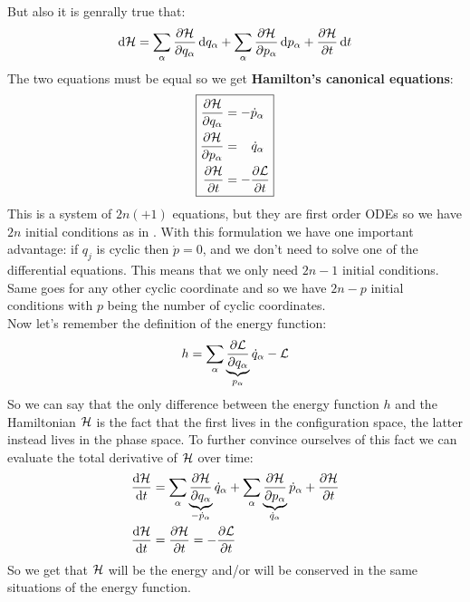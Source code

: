 But also it is genrally true that:
\begin{equation}
    \dd{\hamfun} = \bigsum_{\alpha} \pdv{\hamfun}{q_{\alpha}}\dd{q_{\alpha}} + \bigsum_{\alpha} \pdv{\hamfun}{p_{\alpha}}\dd{p_{\alpha}} + \pdv{\hamfun}{t}\dd{t}
\end{equation}
The two equations must be equal so we get \textbf{Hamilton's canonical equations}:
\begin{equation} \label{hamilton_equations}
    \boxed{
    \begin{aligned}
        \pdv{\hamfun}{q_{\alpha}} &= -\dot{p}_{\alpha}\\
        \pdv{\hamfun}{p_{\alpha}} &=\;\;\;\dot{q}_{\alpha}\\
        \pdv{\hamfun}{t} &= -\pdv{\lagr}{t}
    \end{aligned}}
\end{equation}
This is a system of $2n (+1)$ equations, but they are first order ODEs so we have $2n$ initial conditions as in \lagrangeref. With this formulation we have one important advantage: if $q_j$ is cyclic then $\dot{p} = 0$, and we don't need to solve one of the differential equations.
This means that we only need $2n-1$ initial conditions. Same goes for any other cyclic coordinate and so we have $2n-p$ initial conditions with $p$ being the number of cyclic coordinates.\\
Now let's remember the definition of the energy function:
\begin{equation}
    h = \bigsum_{\alpha}\underbrace{\pdv{\lagr}{q_{\alpha}}}_{p_{\alpha}}\dot{q}_{\alpha} - \lagr
\end{equation}
So we can say that the only difference between the energy function $h$ and the Hamiltonian $\mathcal{H}$ is the fact that the first lives in the configuration space, the latter instead lives in the phase space.
To further convince ourselves of this fact we can evaluate the total derivative of $\mathcal{H}$ over time:
\begin{equation}
    \begin{split}
        \dv{\hamfun}{t} &= \bigsum_{\alpha}\underbrace{\pdv{\hamfun}{q_{\alpha}}}_{-\dot{p}_{\alpha}}\dot{q}_{\alpha} + \bigsum_{\alpha}\underbrace{\pdv{\hamfun}{p_{\alpha}}}_{\dot{q}_{\alpha}}\dot{p}_{\alpha} + \pdv{\hamfun}{t} \\
        \dv{\hamfun}{t} &= \pdv{\hamfun}{t} = -\pdv{\lagr}{t}
    \end{split}
\end{equation}
So we get that $\mathcal{H}$ will be the energy and/or will be conserved in the same situations of the energy function.

